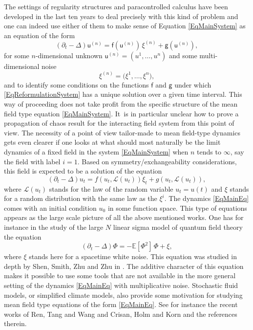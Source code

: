 \documentclass[JEP,XML,SOM,Unicode,published]{cedram}
\theoremstyle{definition}
\newcommand\bbE{\mathbb{E}}
\newcommand{\mcL}{\mathcal{L}}
\begin{document}
The settings of regularity structures and paracontrolled calculus have been developed in the last ten years to deal precisely with this kind of problem and one can indeed use either of them to make sense of Equation \eqref{EqMainSystem} as an equation of the form\vspace*{-3pt}
\begin{equation} \label{EqReformulationSystem}
(\partial_t-\Delta) \mathsf{u}^{(n)} = \mathsf{f}(\mathsf{u}^{(n)})\,\xi^{(n)} + \mathsf{g}(\mathsf{u}^{(n)}),
\end{equation}
for some $n$-dimensional unknown $\mathsf{u}^{(n)} = (u^1,\dots,u^n)$ and some multi-dimensional noise\vspace*{-5pt}
\[
\xi^{(n)} = \bigl(\xi^1,\dots,\xi^n\bigr),
\]
and to identify some conditions on the functions $\mathsf{f}$ and $\mathsf{g}$ under which \eqref{EqReformulationSystem} has a unique solution over a given time interval. This way of proceeding does not take profit from the specific structure of the mean field type equation \eqref{EqMainSystem}. It~is in particular unclear how to prove a propagation of chaos result for the interacting field system from this point of view. The necessity of a point of view tailor-made to mean field-type dynamics gets even clearer if one looks at what should most naturally be the limit dynamics of a fixed field in the system \eqref{EqMainSystem} when $n$ tends to $\infty$, say the field with label $i=1$. Based on symmetry/exchangeability considerations, this field is expected to be a solution of the equation\vspace*{-3pt}
\begin{equation} \label{EqMainEq}
(\partial_t-\Delta)u_t = f(u_t, \mcL(u_t)) \xi_t + g(u_t, \mcL(u_t)),
\end{equation}
where $\mcL(u_t)$ stands for the law of the random variable $u_t=u(t)$ and $\xi$ stands for a random distribution with the same law as the $\xi^i$. The dynamics \eqref{EqMainEq} comes with an initial condition $u_0$ in some function space. This type of equations appears as the large scale picture of all the above mentioned works. One has for instance in the study of the large $N$ linear sigma model of quantum field theory the equation\vspace*{-3pt}
\begin{equation} \label{EqLinearSigma}
(\partial_t-\Delta) \Phi = -\bbE[\Phi^2] \, \Phi + \xi,
\end{equation}
where $\xi$ stands here for a spacetime white noise. This equation was studied in depth by Shen, Smith, Zhu and Zhu in \cite{SZZ22-3D, SSZZ22}. The additive character of this equation makes it possible to use some tools that are not available in the more general setting of the dynamics \eqref{EqMainEq} with multiplicative noise. Stochastic fluid models, or simplified climate models, also provide some motivation for studying mean field type equations of the form \eqref{EqMainEq}. See for instance the recent works of Ren, Tang and Wang \cite{RTW} and Crisan, Holm and Korn \cite{CHK} and the references therein.
\end{document}

